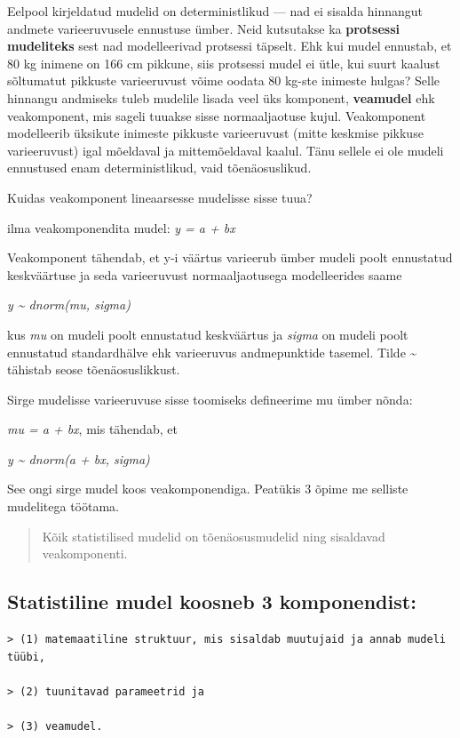 \documentclass[]{book}
\begin{document}
Eelpool kirjeldatud mudelid on deterministlikud --- nad ei sisalda
hinnangut andmete varieeruvusele ennustuse ümber. Neid kutsutakse ka
\textbf{protsessi mudeliteks} sest nad modelleerivad protsessi täpselt.
Ehk kui mudel ennustab, et 80 kg inimene on 166 cm pikkune, siis
protsessi mudel ei ütle, kui suurt kaalust sõltumatut pikkuste
varieeruvust võime oodata 80 kg-ste inimeste hulgas? Selle hinnangu
andmiseks tuleb mudelile lisada veel üks komponent, \textbf{veamudel}
ehk veakomponent, mis sageli tuuakse sisse normaaljaotuse kujul.
Veakomponent modelleerib üksikute inimeste pikkuste varieeruvust (mitte
keskmise pikkuse varieeruvust) igal mõeldaval ja mittemõeldaval kaalul.
Tänu sellele ei ole mudeli ennustused enam deterministlikud, vaid
tõenäosuslikud.

Kuidas veakomponent lineaarsesse mudelisse sisse tuua?

ilma veakomponendita mudel: \emph{y = a + bx}

Veakomponent tähendab, et y-i väärtus varieerub ümber mudeli poolt
ennustatud keskväärtuse ja seda varieeruvust normaaljaotusega
modelleerides saame

\emph{y \textasciitilde{} dnorm(mu, sigma)}

kus \emph{mu} on mudeli poolt ennustatud keskväärtus ja \emph{sigma} on
mudeli poolt ennustatud standardhälve ehk varieeruvus andmepunktide
tasemel. Tilde \textasciitilde{} tähistab seose tõenäosuslikkust.

Sirge mudelisse varieeruvuse sisse toomiseks defineerime mu ümber nõnda:

\emph{mu = a + bx}, mis tähendab, et

\emph{y \textasciitilde{} dnorm(a + bx, sigma)}

See ongi sirge mudel koos veakomponendiga. Peatükis 3 õpime me selliste
mudelitega töötama.

\begin{quote}
Kõik statistilised mudelid on tõenäosusmudelid ning sisaldavad
veakomponenti.
\end{quote}

\subsection{Statistiline mudel koosneb 3
komponendist:}\label{statistiline-mudel-koosneb-3-komponendist}

\begin{verbatim}
> (1) matemaatiline struktuur, mis sisaldab muutujaid ja annab mudeli tüübi, 

> (2) tuunitavad parameetrid ja 

> (3) veamudel.
\end{verbatim}
\end{document}
